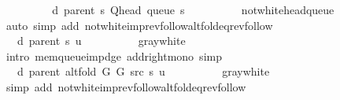 \begin{isabellebody}
\ \ \ \ \isamarkupfalse%
\ \isamarkupfalse%
\ {\isachardoublequoteopen}{\isachardot}{\kern0pt}{\isachardot}{\kern0pt}{\isachardot}{\kern0pt}\ {\isacharequal}{\kern0pt}\ d\ {\isacharparenleft}{\kern0pt}parent\ s{\isacharparenright}{\kern0pt}\ {\isacharparenleft}{\kern0pt}Q{\isacharunderscore}{\kern0pt}head\ {\isacharparenleft}{\kern0pt}queue\ s{\isacharparenright}{\kern0pt}{\isacharparenright}{\kern0pt}\ {\isacharplus}{\kern0pt}\ {}{\isachardoublequoteclose}\isanewline
\ \ \ \ \ \ \isamarkupfalse%
\ not{\isacharunderscore}{\kern0pt}white{\isacharunderscore}{\kern0pt}head{\isacharunderscore}{\kern0pt}queue\isanewline
\ \ \ \ \ \ \isamarkupfalse%
\ {\isacharparenleft}{\kern0pt}auto\ simp\ add{\isacharcolon}{\kern0pt}\ not{\isacharunderscore}{\kern0pt}white{\isacharunderscore}{\kern0pt}imp{\isacharunderscore}{\kern0pt}rev{\isacharunderscore}{\kern0pt}follow{\isacharunderscore}{\kern0pt}alt{\isacharunderscore}{\kern0pt}fold{\isacharunderscore}{\kern0pt}eq{\isacharunderscore}{\kern0pt}rev{\isacharunderscore}{\kern0pt}follow{\isacharparenright}{\kern0pt}\isanewline
\ \ \ \ \isamarkupfalse%
\ \isamarkupfalse%
\ {\isachardoublequoteopen}{\isachardot}{\kern0pt}{\isachardot}{\kern0pt}{\isachardot}{\kern0pt}\ {\isasymle}\ d\ {\isacharparenleft}{\kern0pt}parent\ s{\isacharparenright}{\kern0pt}\ u\ {\isacharplus}{\kern0pt}\ {}{\isachardoublequoteclose}\isanewline
\ \ \ \ \ \ \isamarkupfalse%
\ gray{\isacharunderscore}{\kern0pt}white\isanewline
\ \ \ \ \ \ \isamarkupfalse%
\ {\isacharparenleft}{\kern0pt}intro\ mem{\isacharunderscore}{\kern0pt}queue{\isacharunderscore}{\kern0pt}imp{\isacharunderscore}{\kern0pt}d{\isacharunderscore}{\kern0pt}ge\ add{\isacharunderscore}{\kern0pt}right{\isacharunderscore}{\kern0pt}mono{\isacharparenright}{\kern0pt}\ simp\isanewline
\ \ \ \ \isamarkupfalse%
\ \isamarkupfalse%
\ {\isachardoublequoteopen}{\isachardot}{\kern0pt}{\isachardot}{\kern0pt}{\isachardot}{\kern0pt}\ {\isacharequal}{\kern0pt}\ d\ {\isacharparenleft}{\kern0pt}parent\ {\isacharparenleft}{\kern0pt}alt{\isacharunderscore}{\kern0pt}fold\ G{}\ G{}\ src\ s{\isacharparenright}{\kern0pt}{\isacharparenright}{\kern0pt}\ u\ {\isacharplus}{\kern0pt}\ {}{\isachardoublequoteclose}\isanewline
\ \ \ \ \ \ \isamarkupfalse%
\ gray{\isacharunderscore}{\kern0pt}white\isanewline
\ \ \ \ \ \ \isamarkupfalse%
\ {\isacharparenleft}{\kern0pt}simp\ add{\isacharcolon}{\kern0pt}\ not{\isacharunderscore}{\kern0pt}white{\isacharunderscore}{\kern0pt}imp{\isacharunderscore}{\kern0pt}rev{\isacharunderscore}{\kern0pt}follow{\isacharunderscore}{\kern0pt}alt{\isacharunderscore}{\kern0pt}fold{\isacharunderscore}{\kern0pt}eq{\isacharunderscore}{\kern0pt}rev{\isacharunderscore}{\kern0pt}follow{\isacharparenright}{\kern0pt}\isanewline

\end{isabellebody}

